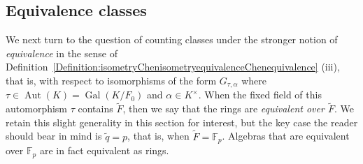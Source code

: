\documentclass[11pt]{amsart}
\theoremstyle{plain}
\newtheorem{proposition}[theorem]{Proposition}
\theoremstyle{definition}
\numberwithin{equation}{section}
\numberwithin{figure}{section}
\newcommand{\FF}{\mathbb{F}}
\newcommand{\os}{{\mathbf{m}}}  %
\newcommand{\de}{{\mathbf{n}}}  %
\newcommand{\N}{\mathbb{N}}
\DeclareMathOperator{\Gal}{Gal}
\DeclareMathOperator{\Aut}{Aut}
\begin{document}

\subsection{Equivalence classes}

We next turn to the question of counting classes under the stronger notion of \emph{equivalence} in the sense of Definition~\ref{Definition:isometryChenisometryequivalenceChenequivalence} (iii), that is, with respect to isomorphisms of the form $G_{\tau,\alpha}$ where $\tau\in \Aut(K)=\Gal(K/F_0)$ and $\alpha\in K^\times$.  When the fixed field of this automorphism $\tau$ contains $\tilde{F}$, then we say that the rings are \emph{equivalent over $\tilde{F}$}.  We retain this slight generality in this section for interest, but the key case the reader should bear in mind is $\tilde{q}=p$, that is,  when $\tilde{F}=\FF_p$.  Algebras that are equivalent over $\FF_p$ are in fact equivalent as rings.
\end{document}
